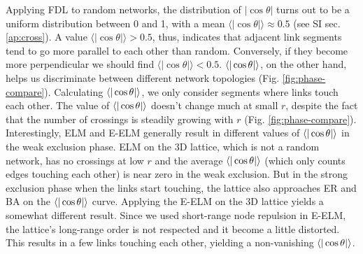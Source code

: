 \documentclass[nofootinbib,preprint,floatfix,endfloats]{revtex4} %
\begin{document}
Applying FDL to random networks,  %
the distribution of $|\cos\theta |$ turns out to be a uniform distribution between 0 and 1, with a mean $\langle |\cos\theta |\rangle \approx 0.5$ (see SI sec. \ref{ap:cross}). 
A value $\langle |\cos\theta |\rangle > 0.5 $, thus, indicates that adjacent link segments tend to go more parallel to each other than random. 
Conversely, if they become more perpendicular we should find $\langle |\cos\theta |\rangle < 0.5 $. 
$\be{|\cos\theta|}$, on the other hand, helps us discriminate between different network topologies (Fig. \ref{fig:phase-compare}). 
Calculating $\be{|\cos\theta|}$, we only consider segments where links touch each other. 
The value of $\be{|\cos\theta|}$ doesn't change much at small $r$, despite the fact that the number of crossings is steadily growing with $r$ (Fig. \ref{fig:phase-compare}).
Interestingly, ELM and E-ELM  generally result in different values of $\be{|\cos\theta|}$ in the weak exclusion phase. 
ELM on the 3D lattice, which is not a random network, has no crossings at low $r$ and the average $\be{|\cos\theta|}$ (which only counts edges touching each other) is near zero in the weak exclusion. But in the strong exclusion phase when the links start touching, the lattice also approaches ER and BA on the $\be{|\cos\theta|}$ curve. 
Applying the E-ELM on the 3D lattice yields a somewhat different result. Since we used short-range node repulsion in E-ELM, the lattice's long-range order is not respected and it become a little distorted. This results in a few links touching each other, yielding a non-vanishing $\be{|\cos\theta|}$.
\end{document}

